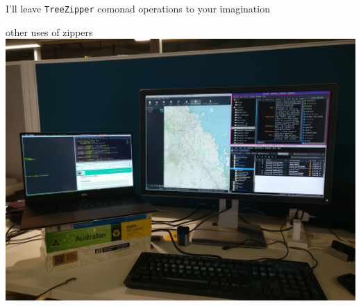\begin{frame}
\begin{center}
I'll leave \lstinline{TreeZipper} comonad operations to your imagination
\end{center}
\end{frame}

\begin{frame}
\begin{block}{other uses of zippers}
\includegraphics[width=1.00\textheight]{image/xmonad.jpg}
\end{block}
\end{frame}
